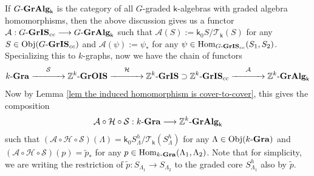 \documentclass[a4paper,reqno,11pt]{amsart}
\numberwithin{equation}{section}
\theoremstyle{definition}
\theoremstyle{remark}
\newcommand{\Obj}{\operatorname{Obj}}
\newcommand{\Hom}{\operatorname{Hom}}
\begin{document}
If $G\textup{-\textbf{GrAlg}}_\mathsf{k}$ is the category of all $G$-graded $\mathsf{k}$-algebras with graded algebra homomorphisms, then the above discussion gives us a functor $\mathcal{A}:G\textup{-\textbf{GrIS}}_{cc}\longrightarrow G\textup{-\textbf{GrAlg}}_{\mathsf{k}}$ such that $\mathcal{A}(S):=\mathsf{k}_0S/{\mathcal{T}_\mathsf{k}(S)}$ for any $S\in \Obj(G\textup{-\textbf{GrIS}}_{cc})$ and $\mathcal{A}(\psi):=\psi_*$ for any $\psi\in \Hom_{G\textup{-\textbf{GrIS}}_{cc}}(S_1,S_2)$. Specializing this to $k$-graphs, now we have the chain of functors \[k\textup{-\textbf{Gra}}\overset{\mathcal{S}}{\xrightarrow{\hspace*{1.2cm}}}\mathbb{Z}^k\textup{-\textbf{GrOIS}}\overset{\mathcal{H}}{\xrightarrow{\hspace*{1.2cm}}}\mathbb{Z}^k\textup{-\textbf{GrIS}}\supset \mathbb{Z}^k\textup{-\textbf{GrIS}}_{cc}\overset{\mathcal{A}}{\xrightarrow{\hspace*{1.2cm}}} \mathbb{Z}^k\textup{-\textbf{GrAlg}}_{\mathsf{k}}\]
Now by Lemma \ref{lem the induced homomorphism is cover-to-cover}, this gives the composition 
\begin{equation}\label{eq func1}
\mathcal{A}\circ \mathcal{H}\circ \mathcal{S}:k\textup{-\textbf{Gra}}\longrightarrow \mathbb{Z}^k\textup{-\textbf{GrAlg}}_{\mathsf{k}}
\end{equation}
such that $(\mathcal{A}\circ \mathcal{H}\circ \mathcal{S})(\Lambda)=\mathsf{k}_0S_\Lambda^h/{\mathcal{T}_\mathsf{k}(S_\Lambda^h)}$ for any $\Lambda\in \Obj(k\textup{-\textbf{Gra}})$ and $(\mathcal{A}\circ \mathcal{H}\circ \mathcal{S})(p)=\tilde{p}_*$ for any $p\in \Hom_{k\textup{-\textbf{Gra}}}(\Lambda_1,\Lambda_2)$. Note that for simplicity, we are writing the restriction of $\tilde{p}:S_{\Lambda_1}\longrightarrow S_{\Lambda_2}$ to the graded core $S_{\Lambda_1}^h$ also by $\tilde{p}$.  
\end{document}
